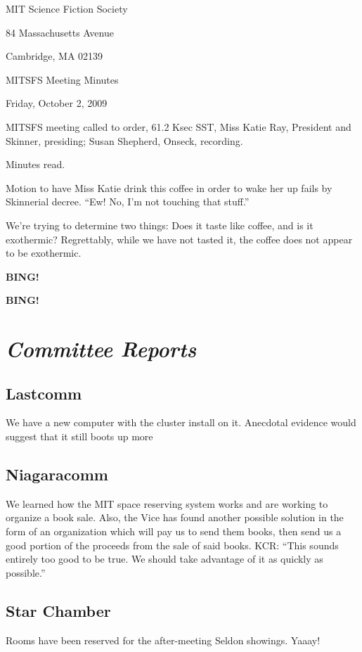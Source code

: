 \documentclass[10pt]{article}
\newcommand{\bing}{{\bf BING!} }
\newcommand{\goto}[1]{\bing \vskip 12pt \section*{{\em{#1}}}}
\begin{document}
\begin{center}

MIT Science Fiction Society

84 Massachusetts Avenue

Cambridge, MA 02139

\vspace{12pt}

MITSFS Meeting Minutes

Friday, October 2, 2009

\end{center}

\vspace{18pt}

\setlength{\parskip}{6pt}

\noindent
MITSFS meeting called to order, 61.2 Ksec SST,
Miss Katie Ray, President and Skinner, presiding; Susan Shepherd, Onseck, recording.

Minutes read.

Motion to have Miss Katie drink this coffee in order to wake her up fails by Skinnerial decree. ``Ew! No, I'm not touching that stuff.''

We're trying to determine two things: Does it taste like coffee, and is it exothermic? Regrettably, while we have not tasted it, the coffee does not appear to be exothermic.

\bing

\goto{Committee Reports}

\subsection*{Lastcomm}
We have a new computer with the cluster install on it. Anecdotal evidence would suggest that it still boots up more 

\subsection*{Niagaracomm}
We learned how the MIT space reserving system works and are working to organize a book sale. Also, the Vice has found another possible solution in the form of an organization which will pay us to send them books, then send us a good portion of the proceeds from the sale of said books. KCR: ``This sounds entirely too good to be true. We should take advantage of it as quickly as possible.''

\subsection*{Star Chamber}
Rooms have been reserved for the after-meeting Seldon showings. Yaaay!
\end{document}
